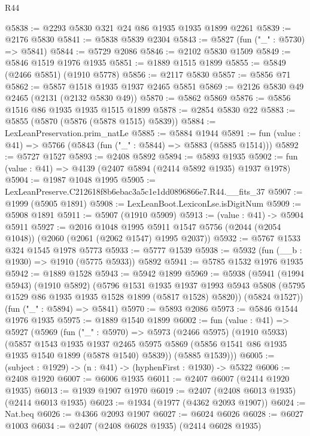 \begin{lexlean}{R44}
\begin{coremodule}
@5838 := @2293 @5830 @321 @24 @86 @1935 @1935 @1899 @2261
@5839 := @2176 @5830
@5841 := @5838 @5839 @2304
@5843 := @5827 (fun ("_" : @5730) => @5841)
@5844 := @5729 @2086
@5846 := @2102 @5830 @1509
@5849 := @5846 @1519 @1976 @1935
@5851 := @1889 @1515 @1899
@5855 := @5849 (@2466 @5851) (@1910 @5778)
@5856 := @2117 @5830
@5857 := @5856 @71
@5862 := @5857 @1518 @1935 @1937 @2465 @5851
@5869 := @2126 @5830 @49 @2465 (@2131 (@2132 @5830 @49))
@5870 := @5862 @5869
@5876 := @5856 @1516 @86 @1935 @1935 @1515 @1899
@5878 := @2854 @5830 @22
@5883 := @5855 (@5870 (@5876 (@5878 @1515) @5839))
@5884 := LexLeanPreservation.prim_natLe
@5885 := @5884 @1944
@5891 := fun (value : @41) => @5766 (@5843 (fun ("_" : @5844) => @5883 (@5885 @1514)))
@5892 := @5727 @1527
@5893 := @2408 @5892
@5894 := @5893 @1935
@5902 := fun (value : @41) => @4139 (@2407 @5894 (@2414 @5892 @1935) @1937 @1978)
@5904 := @1987 @1048 @1995
@5905 := LexLeanPreserve.C212618f8b6ebac3a5c1e1dd0896866e7.R44.__fits_37
@5907 := @1999 (@5905 @1891)
@5908 := LexLeanBoot.LexiconLse.isDigitNum
@5909 := @5908 @1891
@5911 := @5907 (@1910 @5909)
@5913 := (value : @41) -> @5904 @5911
@5927 := @2016
    @1048
    @1995
    @5911
    @1547
    @5756
    (@2044 (@2054 @1048))
    (@2060 (@2061 (@2062 @1547) @1995 @2037))
@5932 := @5767 @1533 @324 @1545 @1978 @5773
@5933 := @5777 @1539
@5938 := @5932 (fun (__b : @1930) => @1910 (@5775 @5933)) @5892
@5941 := @5785 @1532 @1976 @1935
@5942 := @1889 @1528
@5943 := @5942 @1899
@5969 := @5938
    (@5941
      (@1994 @5943)
      (@1910 @5892)
      (@5796
        @1531
        @1935
        @1937
        @1993
        @5943
        @5808
        (@5795 @1529 @86 @1935 @1935 @1528 @1899 (@5817 @1528) @5820))
      (@5824 @1527))
    (fun ("_" : @5894) => @5841)
@5970 := @5893 @2086
@5973 := @5846 @1544 @1976 @1935
@5975 := @1889 @1540 @1899
@6002 := fun (value : @41) =>
  @5927
    (@5969
      (fun ("_" : @5970) =>
      @5973
        (@2466 @5975)
        (@1910 @5933)
        (@5857
          @1543
          @1935
          @1937
          @2465
          @5975
          @5869
          (@5856 @1541 @86 @1935 @1935 @1540 @1899 (@5878 @1540) @5839))
        (@5885 @1539)))
@6005 := (subject : @1929) -> (n : @41) -> (hyphenFirst : @1930) -> @5322
@6006 := @2408 @1920
@6007 := @6006 @1935
@6011 := @2407 @6007 (@2414 @1920 @1935)
@6013 := @1939 @1907 @1970
@6019 := @2407 (@2408 @6013 @1935) (@2414 @6013 @1935)
@6023 := @1934 (@1977 (@4362 @2093 @1907))
@6024 := Nat.beq
@6026 := @4366 @2093 @1907
@6027 := @6024 @6026
@6028 := @6027 @1003
@6034 := @2407 (@2408 @6028 @1935) (@2414 @6028 @1935)

\end{coremodule}
\end{lexlean}
